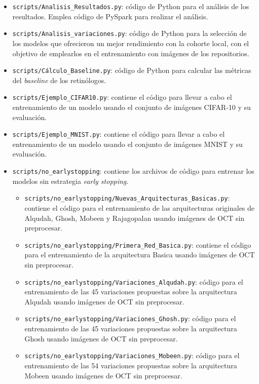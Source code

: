 \begin{itemize}
    \item \texttt{scripts/Analisis\_Resultados.py}: código de Python para el análisis de los resultados. Emplea código de PySpark para realizar el análisis.
    \item \texttt{scripts/Analisis\_variaciones.py}: código de Python para la selección de los modelos que ofrecieron un mejor rendimiento con la cohorte local, con el objetivo de emplearlos en el entrenamiento con imágenes de los repositorios.
    \item \texttt{scripts/Cálculo\_Baseline.py}: código de Python para calcular las métricas del \textit{baseline} de los retinólogos.
    \item \texttt{scripts/Ejemplo\_CIFAR10.py}: contiene el código para llevar a cabo el entrenamiento de un modelo usando el conjunto de imágenes CIFAR-10 y su evaluación.
    \item \texttt{scripts/Ejemplo\_MNIST.py}: contiene el código para llevar a cabo el entrenamiento de un modelo usando el conjunto de imágenes MNIST y su evaluación.
    \item \texttt{scripts/no\_earlystopping}: contiene los archivos de código para entrenar los modelos sin estrategia \textit{early stopping}.
    \begin{itemize}
        \item \texttt{scripts/no\_earlystopping/Nuevas\_Arquitecturas\_Basicas.py}: contiene el código para el entrenamiento de las arquitecturas originales de Alqudah, Ghosh, Mobeen y Rajagopalan usando imágenes de OCT sin preprocesar.
        \item \texttt{scripts/no\_earlystopping/Primera\_Red\_Basica.py}: contiene el código para el entrenamiento de la arquitectura Basica usando imágenes de OCT sin preprocesar.
        \item \texttt{scripts/no\_earlystopping/Variaciones\_Alqudah.py}: código para el entrenamiento de las 45 variaciones propuestas sobre la arquitectura Alqudah usando imágenes de OCT sin preprocesar.
        \item \texttt{scripts/no\_earlystopping/Variaciones\_Ghosh.py}: código para el entrenamiento de las 45 variaciones propuestas sobre la arquitectura Ghosh usando imágenes de OCT sin preprocesar.
        \item \texttt{scripts/no\_earlystopping/Variaciones\_Mobeen.py}: código para el entrenamiento de las 54 variaciones propuestas sobre la arquitectura Mobeen usando imágenes de OCT sin preprocesar.

\end{itemize}
\end{itemize}
